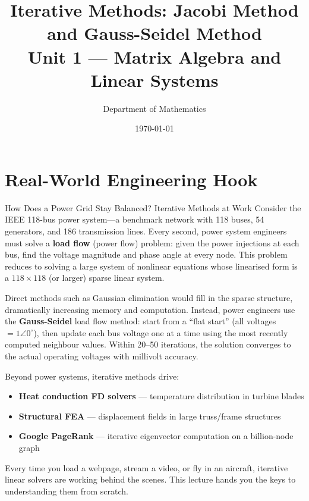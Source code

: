 \documentclass[12pt,a4paper]{article}
\title{\textbf{Iterative Methods: Jacobi Method and Gauss-Seidel Method} \\
       \large Unit 1 --- Matrix Algebra and Linear Systems}
\author{Department of Mathematics}
\date{\today}
\begin{document}
\maketitle
\tableofcontents
\newpage

\section{Real-World Engineering Hook}

\begin{curiositybox}{How Does a Power Grid Stay Balanced? Iterative Methods at Work}
Consider the IEEE 118-bus power system---a benchmark network with 118 buses, 54 generators,
and 186 transmission lines. Every second, power system engineers must solve a \textbf{load flow}
(power flow) problem: given the power injections at each bus, find the voltage magnitude and
phase angle at every node. This problem reduces to solving a large system of nonlinear equations
whose linearised form is a \(118 \times 118\) (or larger) sparse linear system.

Direct methods such as Gaussian elimination would fill in the sparse structure, dramatically
increasing memory and computation. Instead, power engineers use the \textbf{Gauss-Seidel}
load flow method: start from a ``flat start'' (all voltages \(= 1\angle 0^{\circ}\)), then update
each bus voltage one at a time using the most recently computed neighbour values. Within 20--50
iterations, the solution converges to the actual operating voltages with millivolt accuracy.

Beyond power systems, iterative methods drive:
\begin{itemize}
  \item \textbf{Heat conduction FD solvers} --- temperature distribution in turbine blades
  \item \textbf{Structural FEA} --- displacement fields in large truss/frame structures
  \item \textbf{Google PageRank} --- iterative eigenvector computation on a billion-node graph
\end{itemize}
Every time you load a webpage, stream a video, or fly in an aircraft, iterative linear solvers
are working behind the scenes. This lecture hands you the keys to understanding them from scratch.
\end{curiositybox}
\end{document}
